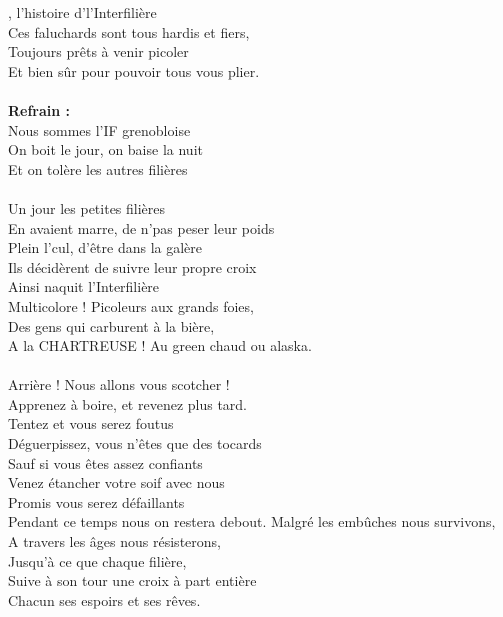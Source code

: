 
, l'histoire d'l'Interfilière
\\Ces faluchards sont tous hardis et fiers,
\\Toujours prêts à venir picoler
\\Et bien sûr pour pouvoir tous vous plier.
\\\\\textbf{Refrain :}
\\Nous sommes l'IF grenobloise
\\On boit le jour, on baise la nuit
\\Et on tolère les autres filières
\\\\Un jour les petites filières
\\En avaient marre, de n'pas peser leur poids
\\Plein l'cul, d'être dans la galère
\\Ils décidèrent de suivre leur propre croix
\\Ainsi naquit l'Interfilière
\\Multicolore ! Picoleurs aux grands foies,
\\Des gens qui carburent à la bière,
\\A la CHARTREUSE ! Au green chaud ou alaska.
\\\\Arrière ! Nous allons vous scotcher !
\\Apprenez à boire, et revenez plus tard.
\\Tentez et vous serez foutus
\\Déguerpissez, vous n'êtes que des tocards
\\Sauf si vous êtes assez confiants
\\Venez étancher votre soif avec nous
\\Promis vous serez défaillants
\\Pendant ce temps nous on restera debout.
\breakpage
Malgré les embûches nous survivons,
\\A travers les âges nous résisterons,
\\Jusqu'à ce que chaque filière,
\\Suive à son tour une croix à part entière
\\Chacun ses espoirs et ses rêves.
